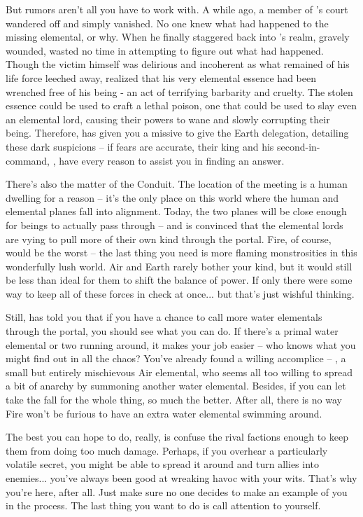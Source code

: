 \documentclass[char]{elementals}
\begin{document}
But rumors aren't all you have to work with. A while ago, a member of \cWaterQueen{}'s court wandered off and simply vanished. No one knew what had happened to the missing elemental, or why. When he finally staggered back into \cWaterQueen{}'s realm, gravely wounded, \cWaterQueen{\they} wasted no time in attempting to figure out what had happened. Though the victim himself was delirious and incoherent as what remained of his life force leeched away, \cWaterQueen{} realized that his very elemental essence had been wrenched free of his being - an act of terrifying barbarity and cruelty. The stolen essence could be used to craft a lethal poison, one that could be used to slay even an elemental lord, causing their powers to wane and slowly corrupting their being. Therefore, \cWaterQueen{} has given you a missive to give the Earth delegation, detailing these dark suspicions -- if \cWaterQueen{\their} fears are accurate, their king and his second-in-command, \cLoyal{\intro}, have every reason to assist you in finding an answer. 

There's also the matter of the Conduit. The location of the meeting is a human dwelling for a reason -- it's the only place on this world where the human and elemental planes fall into alignment. Today, the two planes will be close enough for beings to actually pass through -- and \cWaterQueen{} is convinced that the elemental lords are vying to pull more of their own kind through the portal. Fire, of course, would be the worst -- the last thing you need is more flaming monstrosities in this wonderfully lush world. Air and Earth rarely bother your kind, but it would still be less than ideal for them to shift the balance of power. If only there were some way to keep all of these forces in check at once... but that's just wishful thinking. 

Still, \cWaterQueen{} has told you that if you have a chance to call more water elementals through the portal, you should see what you can do. If there's a primal water elemental or two running around, it makes your job easier -- who knows what you might find out in all the chaos? You've already found a willing accomplice -- \cMiniAir{\intro}, a small but entirely mischievous Air elemental, who seems all too willing to spread a bit of anarchy by summoning another water elemental. Besides, if you can let \cMiniAir{\them} take the fall for the whole thing, so much the better. After all, there is no way Fire won't be furious to have an extra water elemental swimming around.

The best you can hope to do, really, is confuse the rival factions enough to keep them from doing too much damage. Perhaps, if you overhear a particularly volatile secret, you might be able to spread it around and turn allies into enemies... you've always been good at wreaking havoc with your wits. That's why you're here, after all. Just make sure no one decides to make an example of you in the process. The last thing you want to do is call attention to yourself.
\end{document}
